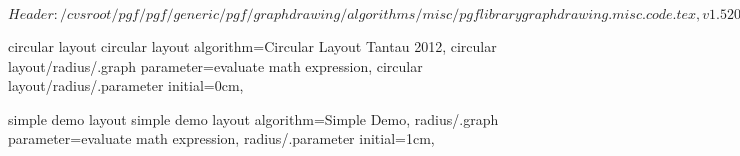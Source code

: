 %
%
%

\ProvidesFileRCS[v\pgfversion] $Header: /cvsroot/pgf/pgf/generic/pgf/graphdrawing/algorithms/misc/pgflibrarygraphdrawing.misc.code.tex,v 1.5 2012/04/03 22:53:13 tantau Exp $



%
%
\pgfgddeclarealgorithmkey
  {circular layout}
  {circular layout}
  {
    algorithm=Circular Layout Tantau 2012,
    circular layout/radius/.graph parameter=evaluate math expression,
    circular layout/radius/.parameter initial=0cm,
  }


%
%
\pgfgddeclarealgorithmkey
  {simple demo layout}
  {simple demo layout}
  {
    algorithm=Simple Demo,
    radius/.graph parameter=evaluate math expression,
    radius/.parameter initial=1cm,
  }



\endinput